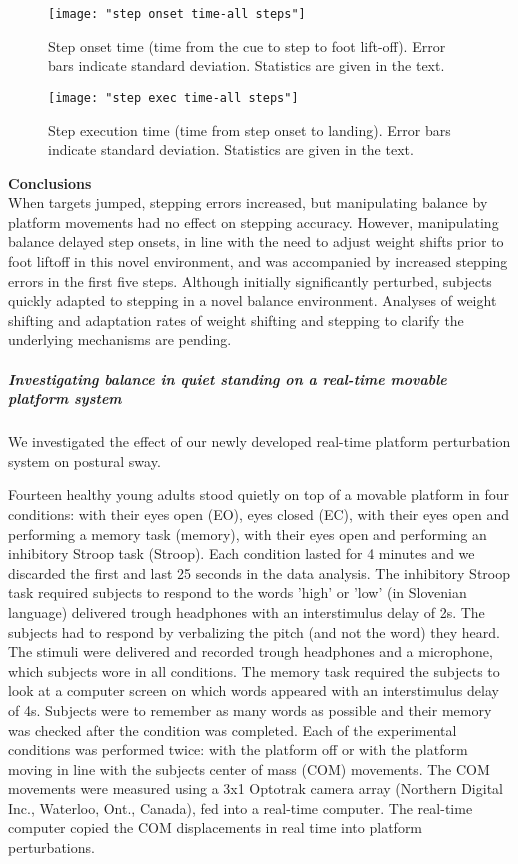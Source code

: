\begin{figure*}
	\centering
	\texttt{[image: "step onset time-all steps"]}
	\caption{Step onset time (time from the cue to step to foot lift-off). Error bars indicate standard deviation. Statistics are given in the text.}
	\label{fig:stepOnsetTimeAll}
\end{figure*}

\begin{figure*}
	\centering
	\texttt{[image: "step exec time-all steps"]}
	\caption{Step execution time (time from step onset to landing). Error bars indicate standard deviation. Statistics are given in the text.}
	\label{fig:stepExecTimeAll}
\end{figure*}

\textbf{Conclusions}\\
When targets jumped, stepping errors increased, but manipulating balance by platform movements had no effect on stepping accuracy. However, manipulating balance delayed step onsets, in line with the need to adjust weight shifts prior to foot liftoff in this novel environment, and was accompanied by increased stepping errors in the first five steps. Although initially significantly perturbed, subjects quickly adapted to stepping in a novel balance environment. Analyses of weight shifting and adaptation rates of weight shifting and stepping to clarify the underlying mechanisms are pending.

\subparagraph*{Investigating balance in quiet standing on a real-time movable platform system}
We investigated the effect of our newly developed real-time platform perturbation system on postural sway.

Fourteen healthy young adults stood quietly on top of a movable platform in four conditions: with their eyes open (EO), eyes closed (EC), with their eyes open and performing a memory task (memory), with their eyes open and performing an inhibitory Stroop task (Stroop). Each condition lasted for 4 minutes and we discarded the first and last 25 seconds in the data analysis. The inhibitory Stroop task required subjects to respond to the words 'high' or 'low' (in Slovenian language) delivered trough headphones with an interstimulus delay of 2s. The subjects had to respond by verbalizing the pitch (and not the word) they heard. The stimuli were delivered and recorded trough headphones and a microphone, which subjects wore in all conditions. The memory task required the subjects to look at a computer screen on which words appeared with an interstimulus delay of 4s. Subjects were to remember as many words as possible and their memory was checked after the condition was completed.
Each of the experimental conditions was performed twice: with the platform off or with the platform moving in line with the subjects center of mass (COM) movements. The COM movements were measured using a 3x1 Optotrak camera array (Northern Digital Inc., Waterloo, Ont., Canada), fed into a real-time computer. The real-time computer copied the COM displacements in real time into platform perturbations.

